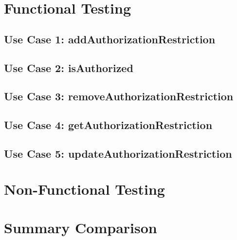 \documentclass[12pt]{article}
\begin{document}

\tableofcontents
\newpage
\section{Functional Testing}
\subsection{Use Case 1: addAuthorizationRestriction}

\newpage
\subsection{Use Case 2: isAuthorized}

\newpage
\subsection{Use Case 3: removeAuthorizationRestriction}


\newpage
\subsection{Use Case 4: getAuthorizationRestriction}


\newpage
\subsection{Use Case 5: updateAuthorizationRestriction}

\section{Non-Functional Testing}

\section{Summary Comparison}

\end{document}
